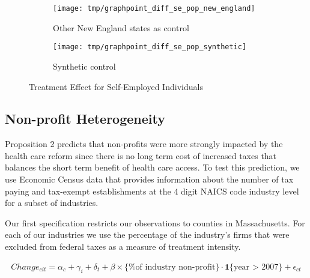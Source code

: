 \documentclass[12pt]{article}
\begin{document}
\begin{figure}[H]
	\centering
	\begin{subfigure}[b]{0.495\textwidth}
		\texttt{[image: tmp/graphpoint\_diff\_se\_pop\_new\_england]}
		\caption{Other New England states as control}
	\end{subfigure}
		\begin{subfigure}[b]{0.495\textwidth}
		\texttt{[image: tmp/graphpoint\_diff\_se\_pop\_synthetic]}
		\caption{Synthetic control}
	\end{subfigure}
	\caption{Treatment Effect for Self-Employed Individuals}
	\label{fig:state_contrast}
\end{figure}

\subsection{Non-profit Heterogeneity}

Proposition 2 predicts that non-profits were more strongly impacted by the health care reform since there is no long term cost of increased taxes that balances the short term benefit of health care access. To test this prediction, we use Economic Census data that provides information about the number of tax paying and tax-exempt establishments at the 4 digit NAICS code industry level for a subset of industries.  

Our first specification restricts our observations to counties in Massachusetts. For each of our industries we use the percentage of the industry's firms that were excluded from federal taxes as a measure of treatment intensity. 
\begin{comment}

We interpret our coefficient of interest as a lower bound estimate of the health care shock impact. It is a lower bound because for-profit industries may have also benefited and we are measuring the difference between the two sets of industries.

\begin{align}
Change_{cit} = \alpha_c + \gamma_i + \delta_t + \beta \, \mathbf{1}\{\text{non-profit industry}\} \cdot \mathbf{1}\{\text{year > 2007}\} + \epsilon_{ct}
\end{align}

\begin{align}
Change_{cit} = & \; \gamma_i \cdot \alpha_c + \gamma_i \cdot \delta_t +  \alpha_c \cdot \delta_t \nonumber   \\
& + \beta \, \mathbf{1}\{\text{non-profit industry}\} \cdot \mathbf{1}\{\text{year > 2007}\}  \cdot \mathbf{1}\{\text{county in  MA}\} \nonumber  \\
& + \epsilon_{ict}
\end{align}

\end{comment}
\begin{align}
Change_{cit} = \alpha_c + \gamma_i + \delta_t + \beta \times \{\text{\% of industry non-profit}\} \cdot \mathbf{1}\{\text{year > 2007}\} + \epsilon_{ct}
\end{align}
\end{document}
